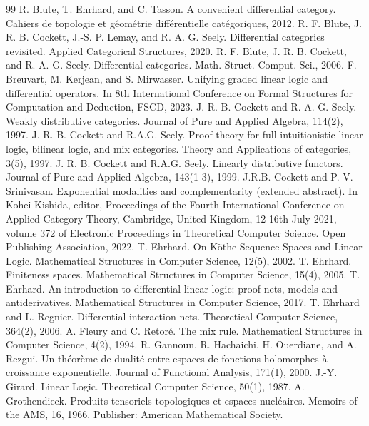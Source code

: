 \begin{thebibliography}{99}
 R. Blute, T. Ehrhard, and C. Tasson. A convenient differential category. Cahiers de topologie et géométrie différentielle catégoriques, 2012.
 R. F. Blute, J. R. B. Cockett, J.-S. P. Lemay, and R. A. G. Seely. Differential categories revisited. Applied Categorical Structures, 2020.
 R. F. Blute, J. R. B. Cockett, and R. A. G. Seely. Differential categories. Math. Struct. Comput. Sci., 2006.
 F. Breuvart, M. Kerjean, and S. Mirwasser. Unifying graded linear logic and differential operators. In 8th International Conference on Formal Structures for Computation and Deduction, FSCD, 2023.
 J. R. B. Cockett and R. A. G. Seely. Weakly distributive categories. Journal of Pure and Applied Algebra, 114(2), 1997.
 J. R. B. Cockett and R.A.G. Seely. Proof theory for full intuitionistic linear logic, bilinear logic, and mix categories. Theory and Applications of categories, 3(5), 1997.
 J. R. B. Cockett and R.A.G. Seely. Linearly distributive functors. Journal of Pure and Applied Algebra, 143(1-3), 1999.
 J.R.B. Cockett and P. V. Srinivasan. Exponential modalities and complementarity (extended abstract). In Kohei Kishida, editor, Proceedings of the Fourth International Conference on Applied Category Theory, Cambridge, United Kingdom, 12-16th July 2021, volume 372 of Electronic Proceedings in Theoretical Computer Science. Open Publishing Association, 2022.
 T. Ehrhard. On Köthe Sequence Spaces and Linear Logic. Mathematical Structures in Computer Science, 12(5), 2002.
 T. Ehrhard. Finiteness spaces. Mathematical Structures in Computer Science, 15(4), 2005.
 T. Ehrhard. An introduction to differential linear logic: proof-nets, models and antiderivatives. Mathematical Structures in Computer Science, 2017.
 T. Ehrhard and L. Regnier. Differential interaction nets. Theoretical Computer Science, 364(2), 2006.
 A. Fleury and C. Retoré. The mix rule. Mathematical Structures in Computer Science, 4(2), 1994.
 R. Gannoun, R. Hachaichi, H. Ouerdiane, and A. Rezgui. Un théorème de dualité entre espaces de fonctions holomorphes à croissance exponentielle. Journal of Functional Analysis, 171(1), 2000.
 J.-Y. Girard. Linear Logic. Theoretical Computer Science, 50(1), 1987.
 A. Grothendieck. Produits tensoriels topologiques et espaces nucléaires. Memoirs of the AMS, 16, 1966. Publisher: American Mathematical Society.

\end{thebibliography}
